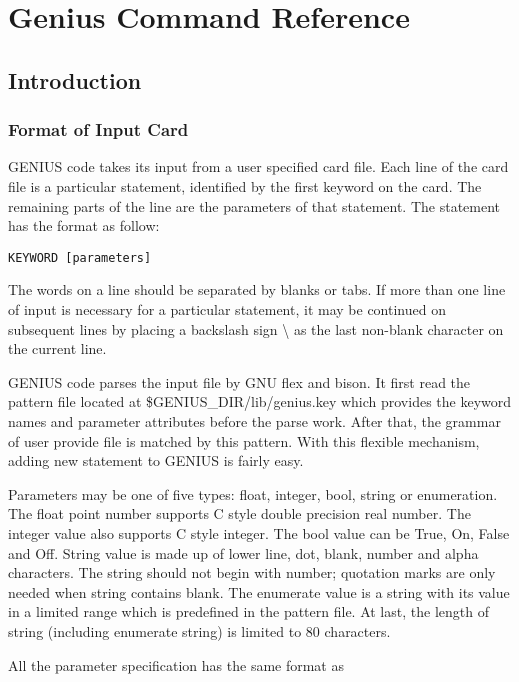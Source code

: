 \documentclass[oneside,12pt]{cgd_book}
\begin{document}
\chapter{Genius Command Reference}
\section{Introduction}
\subsection{Format of Input Card}
GENIUS code takes its input from a user specified card file. Each line of the card file is a particular
        statement, identified by the first keyword on the card. The remaining parts of the line are the parameters of
        that statement. The statement has the format as follow:
\par
\begin{lstlisting}[style=GeniusCmd]
KEYWORD [parameters]
\end{lstlisting}
The words on a line should be separated by blanks or tabs. If more than one line of input is necessary for
        a particular statement, it may be continued on subsequent lines by placing a backslash sign \textbackslash{} as the last
        non-blank character on the current line.
\par
GENIUS code parses the input file by GNU flex and bison. It first read the
        pattern file located at \$GENIUS\_DIR/lib/genius.key
which provides the keyword names and
        parameter attributes before the parse work. After that, the grammar of user provide file is matched by this
        pattern. With this flexible mechanism, adding new statement to GENIUS is fairly easy.
\par
Parameters may be one of five types: float, integer, bool, string or enumeration. The float point number
        supports C style double precision real number. The integer value also supports C style integer. The bool value
        can be True, On, False and Off. String value is made up of lower line, dot, blank, number and alpha characters.
        The string should not begin with number; quotation marks are only needed when string contains blank. The
        enumerate value is a string with its value in a limited range which is predefined in the pattern file. At last,
        the length of string (including enumerate string) is limited to 80 characters.
\par
All the parameter specification has the same format as
\par
\end{document}
